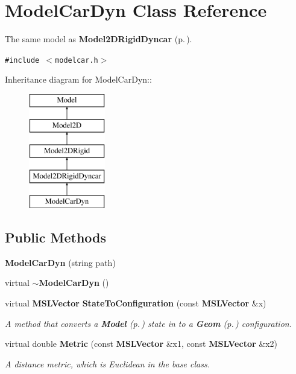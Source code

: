 \section{Model\-Car\-Dyn  Class Reference}
\label{classModelCarDyn}
The same model as {\bf Model2DRigid\-Dyncar} {\rm (p.\,\pageref{classModel2DRigidDyncar})}. 


{\tt \#include $<$modelcar.h$>$}

Inheritance diagram for Model\-Car\-Dyn::\begin{figure}[H]
\begin{center}
\leavevmode
\includegraphics[height=5cm]{classModelCarDyn}
\end{center}
\end{figure}
\subsection*{Public Methods}
\begin{CompactItemize}
\item 
{\bf Model\-Car\-Dyn} (string path)
\item 
virtual {\bf $\sim$Model\-Car\-Dyn} ()
\item 
virtual {\bf MSLVector} {\bf State\-To\-Configuration} (const {\bf MSLVector} \&x)
\begin{CompactList}\small\item\em A method that converts a {\bf Model} {\rm (p.\,\pageref{classModel})} state in to a {\bf Geom} {\rm (p.\,\pageref{classGeom})} configuration.\item\end{CompactList}\item 
virtual double {\bf Metric} (const {\bf MSLVector} \&x1, const {\bf MSLVector} \&x2)
\begin{CompactList}\small\item\em A distance metric, which is Euclidean in the base class.\item\end{CompactList}\end{CompactItemize}


